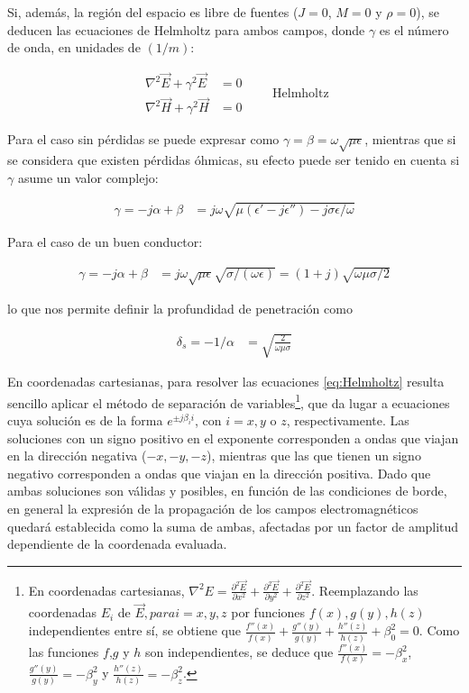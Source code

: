 Si, además, la región del espacio es libre de fuentes ($J=0$, $M=0$ y $\rho=0$), se deducen las ecuaciones de Helmholtz para ambos campos, donde $\gamma$ es el número de onda, en unidades de $(1/m)$:

\begin{equation}
	\label{eq:Helmholtz}
	\begin{aligned}
		\nabla^2  \vec{E} + \gamma^2 \vec{E} &= 0  \\
		\nabla^2 \vec{H} + \gamma^2 \vec{H}& = 0 
	\end{aligned}
	\qquad \text{Helmholtz}
\end{equation}

Para el caso sin pérdidas se puede expresar como $\gamma = \beta = \omega \sqrt{\mu \epsilon}$, mientras que si se considera que existen pérdidas óhmicas,  su efecto puede ser tenido en cuenta si  $\gamma$ asume un valor complejo:

\begin{align}
\label{eq:constante-propagacion-compleja}
\gamma = -j\alpha + \beta &= j\omega \sqrt{\mu (\epsilon'-j\epsilon'') - j \sigma \epsilon/\omega}
\end{align}

Para el caso de un buen conductor:

\begin{align}
\gamma = -j\alpha + \beta &= j \omega \sqrt{\mu \epsilon} \sqrt{\sigma/(\omega \epsilon)} = (1+j) \sqrt{\omega \mu \sigma/2}
\end{align}

lo que nos permite definir la profundidad de penetración como 

\begin{align}
\delta_s = -1/\alpha &= \sqrt{\frac{2}{\omega \mu \sigma}}
\end{align}

En coordenadas cartesianas, para resolver las ecuaciones \ref{eq:Helmholtz} resulta sencillo aplicar el método de separación de variables\footnote{En coordenadas cartesianas, $\nabla^2 E = \frac{\partial^2 \vec{E}}{\partial x^2} + \frac{\partial^2 \vec{E}}{\partial y^2} + \frac{\partial^2 \vec{E}}{\partial z^2}$. Reemplazando las coordenadas $E_i$ de $\vec{E}, para i=x,y,z$ por funciones $f(x),g(y),h(z)$ independientes entre sí, se obtiene que $\frac{f''(x)}{f(x)} + \frac{g''(y)}{g(y)} + \frac{h''(z)}{h(z)} + \beta_0^2 = 0$. Como las funciones $f$,$g$ y $h$ son independientes, se deduce que $\frac{f''(x)}{f(x)} = -\beta_x^2$, $\frac{g''(y)}{g(y)} = -\beta_y^2$ y $\frac{h''(z)}{h(z)} = -\beta_z^2$.}, que da lugar a ecuaciones cuya solución es de la forma $e^{\pm j \beta_i i}$, con $i = x, y$ o $z$, respectivamente. Las soluciones con un signo positivo en el exponente corresponden a ondas que viajan en la dirección negativa ($-x, -y, -z$), mientras que las que tienen un signo negativo corresponden a ondas que viajan en la dirección positiva. Dado que ambas soluciones son válidas y posibles, en función de las condiciones de borde, en general la expresión de la propagación de los campos electromagnéticos quedará establecida como la suma de ambas, afectadas por un factor de amplitud dependiente de la coordenada evaluada.

